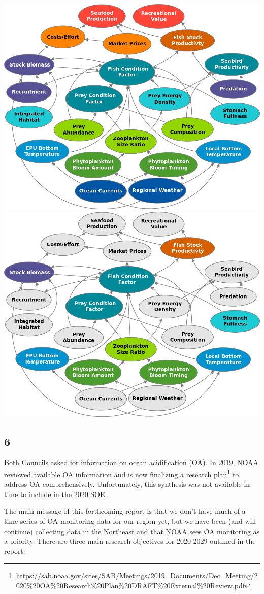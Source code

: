 \documentclass[
  10pt,
]{article}
\let\origfigure\figure
\let\endorigfigure\endfigure
\renewenvironment{figure}[1][2] {
    \expandafter\origfigure\expandafter[H]
} {
    \endorigfigure
}
\begin{document}
\begin{figure}

{\centering \includegraphics[width=0.49\linewidth]{images/SOEconditionfactorlinks_color} \includegraphics[width=0.49\linewidth]{images/SOEconditionfactorlinks_keycolor} 

}

\caption{Full set of hypothesized relationships between SOE indicators related to fish condition (left) and subset to be investigated first (right).}\label{fig:researchlinks}
\end{figure}

\hypertarget{section-5}{%
\subsection{6}\label{section-5}}

Both Councils asked for information on ocean acidification (OA). In
2019, NOAA reviewed available OA information and is now finalizing a
research plan\footnote{\url{https://sab.noaa.gov/sites/SAB/Meetings/2019_Documents/Dec_Meeting/2020\%20OA\%20Research\%20Plan\%20DRAFT\%20External\%20Review.pdf}}
to address OA comprehensively. Unfortunately, this synthesis was not
available in time to include in the 2020 SOE.

The main message of this forthcoming report is that we don't have much
of a time series of OA monitoring data for our region yet, but we have
been (and will continue) collecting data in the Northeast and that NOAA
sees OA monitoring as a priority. There are three main research
objectives for 2020-2029 outlined in the report:
\end{document}
